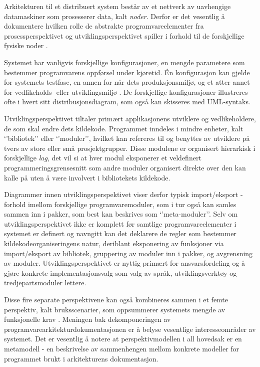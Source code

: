 Arkitekturen til et distribuert system består av et nettverk av uavhengige datamaskiner som prosesserer data, kalt \emph{noder}. Derfor er det vesentlig å dokumentere hvilken rolle de abstrakte programvareelementer fra prosessperspektivet og utviklingsperspektivet spiller i forhold til de forskjellige fysiske noder \citep{kruchten1995}.

Systemet har vanligvis forskjellige konfigurasjoner, en mengde parametere som bestemmer programvarens oppførsel under kjøretid. Én konfigurasjon kan gjelde for systemets testfase, en annen for når dets produksjonsmiljø, og et atter annet for vedlikeholds- eller utviklingsmiljø \citep{kruchten1995}. De forskjellige konfigurasjoner illustreres ofte i hvert sitt distribusjonsdiagram, som også kan skisseres med UML-syntaks.

Utviklingsperspektivet tiltaler primært applikasjonens utviklere og vedlikeholdere, de som skal endre dets kildekode. Programmet inndeles i mindre enheter, kalt ‘’bibliotek’’ eller ‘’moduler’’, hvilket kan refereres til og benyttes av utviklere på tvers av store eller små prosjektgrupper. Disse modulene er organisert hierarkisk i forskjellige \emph{lag}, det vil si at hver modul eksponerer et veldefinert programmeringsgrensesnitt som andre moduler organisert direkte over den kan kalle på uten å være involvert i bibliotekets kildekode.

Diagrammer innen utviklingsperspektivet viser derfor typisk import/eksport - forhold imellom forskjellige programvaremoduler, som i tur også kan samles sammen inn i pakker, som best kan beskrives som ‘’meta-moduler’’. Selv om utviklingsperspektivet ikke er komplett før samtlige programvareelementer i systemet er definert og navngitt kan det deklarere de regler som bestemmer kildekodeorganiseringens natur, deriblant eksponering av funksjoner via import/eksport av bibliotek, gruppering av moduler inn i pakker, og avgrensning av moduler. Utviklingsperspektivet er nyttig primært for ansvarsfordeling og å gjøre konkrete implementasjonsvalg som valg av språk, utviklingsverktøy og tredjepartsmoduler lettere.

Disse fire separate perspektivene kan også kombineres sammen i et femte perspektiv, kalt bruksscenarier, som oppsummerer systemets mengde av funksjonelle krav \citep{kruchten1995}. Meningen bak dekomponeringen av programvarearkitekturdokumentasjonen er å belyse vesentlige interesseområder av systemet. Det er vesentlig å notere at perspektivmodellen i all hovedsak er en metamodell - en beskrivelse av sammenhengen mellom konkrete modeller for programmet brukt i arkitekturens dokumentasjon.

